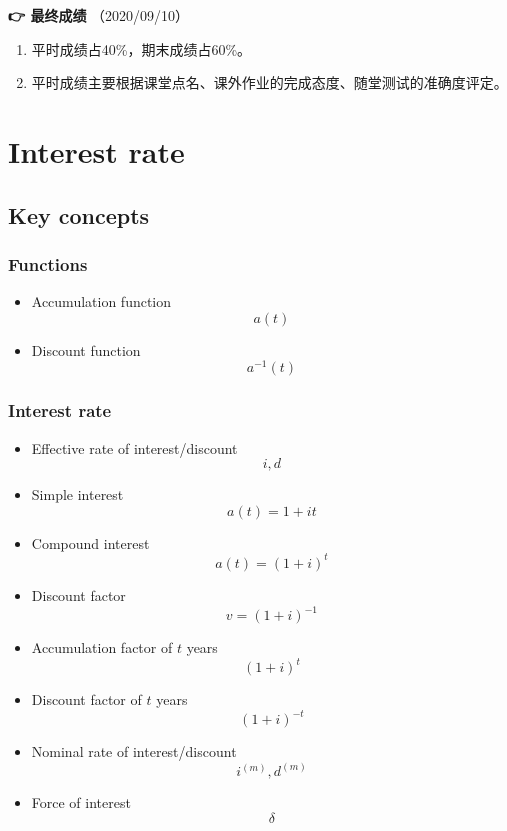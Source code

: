\documentclass[
]{book}
\begin{document}
\textbf{👉 最终成绩} （2020/09/10）

\begin{enumerate}
\def\labelenumi{\arabic{enumi}.}
\item
  平时成绩占40\%，期末成绩占60\%。
\item
  平时成绩主要根据课堂点名、课外作业的完成态度、随堂测试的准确度评定。
\end{enumerate}

\hypertarget{interest-rate}{%
\chapter{Interest rate}\label{interest-rate}}

\hypertarget{key-concepts}{%
\section{Key concepts}\label{key-concepts}}

\hypertarget{functions}{%
\subsection*{Functions}\label{functions}}

\begin{itemize}
\item
  Accumulation function \[a(t)\]
\item
  Discount function \[a^{-1}(t)\]
\end{itemize}

\hypertarget{interest-rate-1}{%
\subsection*{Interest rate}\label{interest-rate-1}}

\begin{itemize}
\item
  Effective rate of interest/discount \[i,d\]
\item
  Simple interest \[a(t)=1+it\]
\item
  Compound interest \[a(t)=(1+i)^t\]
\item
  Discount factor \[v=(1+i)^{-1}\]
\item
  Accumulation factor of \(t\) years \[(1+i)^t\]
\item
  Discount factor of \(t\) years \[(1+i)^{-t}\]
\item
  Nominal rate of interest/discount \[i^{(m)},d^{(m)}\]
\item
  Force of interest \[\delta\]
\end{itemize}
\end{document}
